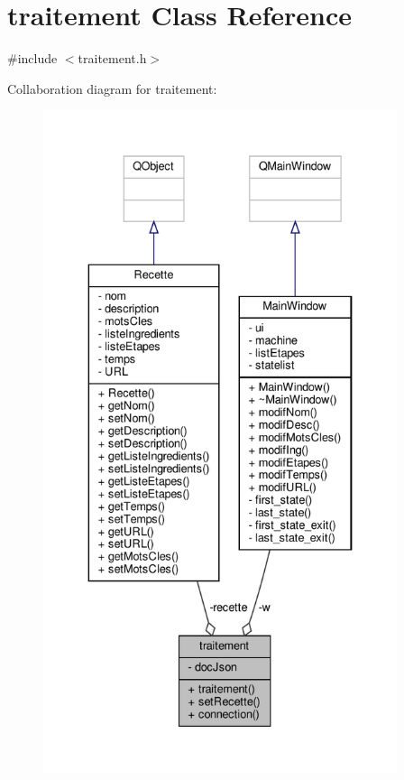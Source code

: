 \hypertarget{classtraitement}{}\section{traitement Class Reference}
\label{classtraitement}


{\ttfamily \#include $<$traitement.\+h$>$}



Collaboration diagram for traitement\+:
\nopagebreak
\begin{figure}[H]
\begin{center}
\leavevmode
\includegraphics[height=550pt]{classtraitement__coll__graph}
\end{center}
\end{figure}
